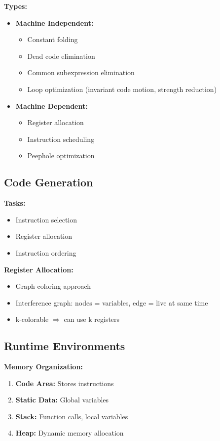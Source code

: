 \documentclass[11pt,a4paper]{article}
\begin{document}
\textbf{Types:}
\begin{itemize}
    \item \textbf{Machine Independent:}
    \begin{itemize}
        \item Constant folding
        \item Dead code elimination
        \item Common subexpression elimination
        \item Loop optimization (invariant code motion, strength reduction)
    \end{itemize}
    \item \textbf{Machine Dependent:}
    \begin{itemize}
        \item Register allocation
        \item Instruction scheduling
        \item Peephole optimization
    \end{itemize}
\end{itemize}

\subsection{Code Generation}

\textbf{Tasks:}
\begin{itemize}
    \item Instruction selection
    \item Register allocation
    \item Instruction ordering
\end{itemize}

\textbf{Register Allocation:}
\begin{itemize}
    \item Graph coloring approach
    \item Interference graph: nodes = variables, edge = live at same time
    \item k-colorable $\Rightarrow$ can use k registers
\end{itemize}

\subsection{Runtime Environments}

\textbf{Memory Organization:}
\begin{enumerate}
    \item \textbf{Code Area:} Stores instructions
    \item \textbf{Static Data:} Global variables
    \item \textbf{Stack:} Function calls, local variables
    \item \textbf{Heap:} Dynamic memory allocation
\end{enumerate}
\end{document}
